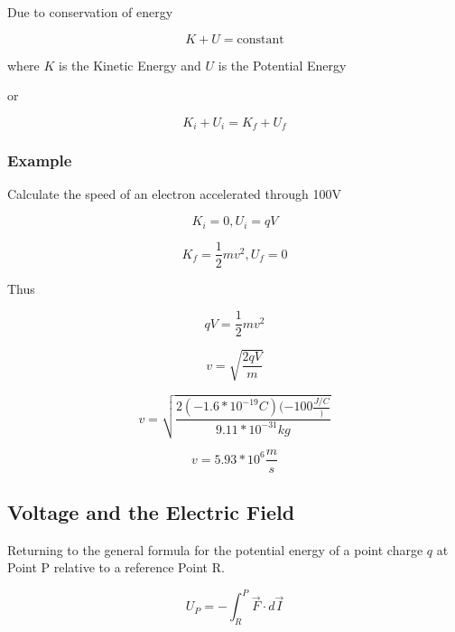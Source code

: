 \documentclass[14pt]{memoir}
\begin{document}
Due to conservation of energy

\begin{equation}
K + U = \text{constant}
\end{equation}

where $K$ is the Kinetic Energy and $U$ is the Potential Energy

or

\begin{equation}
K_i + U_i = K_f + U_f
\end{equation}

\subsubsection{Example}
Calculate the speed of an electron accelerated through 100V

\begin{equation}
K_i = 0, U_i = qV
\end{equation}

\begin{equation}
K_f = \frac{1}{2}mv^2, U_f = 0
\end{equation}

Thus

\begin{equation}
qV = \frac{1}{2}mv^2
\end{equation}

\begin{equation}
v = \sqrt{\frac{2qV}{m}}
\end{equation}

\begin{equation}
v = \sqrt{\frac{2 (-1.6 * 10^{-19}C)(-100 \frac{J/C})}{9.11*10^{-31} kg}}
\end{equation}

\begin{equation}
v = 5.93 * 10^6 \frac{m}{s}
\end{equation}

\subsection{Voltage and the Electric Field}

Returning to the general formula for the potential energy of a point charge $q$ at Point P relative to a reference Point R.

\begin{equation}
U_P = - \int_{R}^{P} \vec{F} \cdot d\vec{I}
\end{equation}
\end{document}
